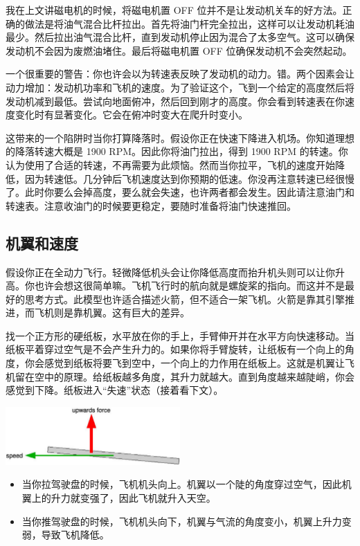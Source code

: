 我在上文讲磁电机的时候，将磁电机置 OFF 位并不是让发动机关车的好方法。正确的做法是将油气混合比杆拉出。首先将油门杆完全拉出，这样可以让发动机耗油最少。然后拉出油气混合比杆，直到发动机停止因为混合了太多空气。这可以确保发动机不会因为废燃油堵住。最后将磁电机置 OFF 位确保发动机不会突然起动。

一个很重要的警告：你也许会以为转速表反映了发动机的动力。错。两个因素会让动力增加：发动机功率和飞机的速度。为了验证这个，飞到一个给定的高度然后将发动机减到最低。尝试向地面俯冲，然后回到刚才的高度。你会看到转速表在你速度变化时有显著变化。它会在俯冲时变大在爬升时变小。

这带来的一个陷阱时当你打算降落时。假设你正在快速下降进入机场。你知道理想的降落转速大概是 1900 RPM。因此你将油门拉出，得到 1900 RPM 的转速。你认为使用了合适的转速，不再需要为此烦恼。然而当你拉平，飞机的速度开始降低，因为转速低。几分钟后飞机速度达到你预期的低速。你没再注意转速已经很慢了。此时你要么会掉高度，要么就会失速，也许两者都会发生。因此请注意油门和转速表。注意收油门的时候要更稳定，要随时准备将油门快速推回。

\subsection{机翼和速度}
\label{sec:WingsAndForce}

假设你正在全动力飞行。轻微降低机头会让你降低高度而抬升机头则可以让你升高。你也许会想这很简单嘛。飞机飞行时的航向就是螺旋桨的指向。而这并不是最好的思考方式。此模型也许适合描述火箭，但不适合一架飞机。火箭是靠其引擎推进，而飞机则是靠机翼。这有巨大的差异。

找一个正方形的硬纸板，水平放在你的手上，手臂伸开并在水平方向快速移动。当纸板平着穿过空气是不会产生升力的。如果你将手臂旋转，让纸板有一个向上的角度，你会感觉到纸板将要飞到空中，一个向上的力作用在纸板上。这就是机翼让飞机留在空中的原理。给纸板越多角度，其升力就越大。直到角度越来越陡峭，你会感觉到下降。纸板进入“失速”状态（接着看下文）。

\begin{center}
\includegraphics[width=0.5\textwidth]{img/tut_31}
\end{center}

\begin{itemize}
    \item 当你拉驾驶盘的时候，飞机机头向上。机翼以一个陡的角度穿过空气，因此机翼上的升力就变强了，因此飞机就升入天空。
    \item 当你推驾驶盘的时候，飞机机头向下，机翼与气流的角度变小，机翼上升力变弱，导致飞机降低。
\end{itemize}

